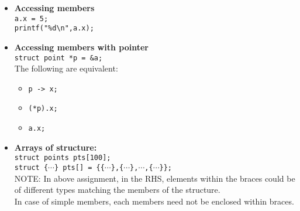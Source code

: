 \begin{multicols*}{3}
\begin{itemize}
\item \textbf{Accessing members}\\
\texttt{a.x = 5;}\\
\texttt{printf("\%d\textbackslash n",a.x);}\\

\item \textbf{Accessing members with pointer}\\
\texttt{struct point *p = \&a;}\\
The following are equivalent:\\
\begin{itemize}
\item \texttt{p -> x;}\\
\item \texttt{(*p).x;}\\
\item \texttt{a.x;}
\end{itemize}

\item \textbf{Arrays of structure:}\\
\texttt{struct points pts[100];}\\
\texttt{struct \{$\cdots$\} pts[] = \{\{$\cdots$\},\{$\cdots$\},$\cdots$,\{$\cdots$\}\};}\\
NOTE: In above assignment, in the RHS, elements within the braces could be of different types matching the members of the structure.\\
In case of simple members, each members need not be enclosed within braces.\\
 
\end{itemize}


\end{multicols*}

